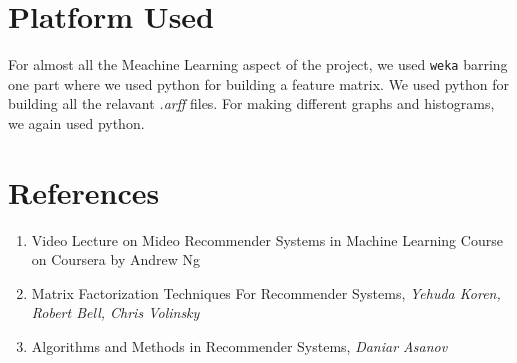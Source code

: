 \documentclass[twocolumn]{article}
\begin{document}
\section*{Platform Used}
For almost all the Meachine Learning aspect of the project, we used \texttt{weka} barring one part where we used python for building a feature matrix. We used python for building all the relavant \emph{.arff} files. For making different graphs and histograms, we again used python.
\section*{References}
\begin{enumerate}
\item Video Lecture on Mideo Recommender Systems in Machine Learning Course on Coursera by Andrew Ng
\item Matrix Factorization Techniques For Recommender Systems, \emph{Yehuda Koren, Robert Bell, Chris Volinsky}
\item Algorithms and Methods in Recommender Systems, \emph{Daniar Asanov}
\end{enumerate}
\end{document}
